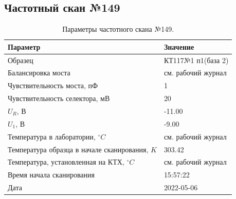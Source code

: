 \subsection{Частотный скан №149}
\begin{table}[!ht]
    \centering
    \caption{Параметры частотного скана №149.}
    \begin{tabular}{|l|l|}
        \hline
        Параметр                                       & Значение                  \\ \hline
        Образец                                        & КТ117№1 п1(база 2)        \\ \hline
        Балансировка моста                             & см. рабочий журнал        \\ \hline
        Чувствительность моста, пФ                     & 1                         \\ \hline
        Чувствительность селектора, мВ                 & 20                        \\ \hline
        $U_R$, В                                       & -11.00                    \\ \hline
        $U_1$, В                                       & -9.00                     \\ \hline
        Температура в лаборатории, $^\circ C$          & см. рабочий журнал        \\ \hline
        Температура образца в начале сканирования, $K$ & 303.42                    \\ \hline
        Температура, установленная на КТХ, $^\circ C$  & см. рабочий журнал        \\ \hline
        Время начала сканирования                      & 15:57:22                  \\ \hline
        Дата                                           & 2022-05-06                \\ \hline
    \end{tabular}
    \label{table:frequency_scan_149}
\end{table}


